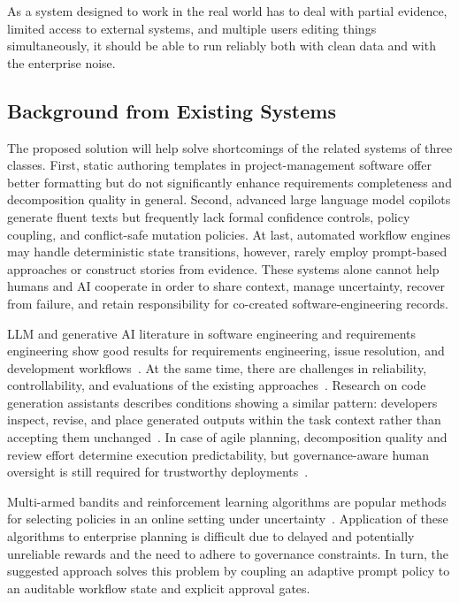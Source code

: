 \documentclass[pdflatex,sn-basic]{sn-jnl}
\begin{document}
As a system designed to work in the real world has to deal with partial evidence, limited access to external systems, and multiple users editing things simultaneously, it should be able to run reliably both with clean data and with the enterprise noise.

\subsection{Background from Existing Systems}
The proposed solution will help solve shortcomings of the related systems of three classes. First, static authoring templates in project-management software offer better formatting but do not significantly enhance requirements completeness and decomposition quality in general. Second, advanced large language model copilots generate fluent texts but frequently lack formal confidence controls, policy coupling, and conflict-safe mutation policies. At last, automated workflow engines may handle deterministic state transitions, however, rarely employ prompt-based approaches or construct stories from evidence. These systems alone cannot help humans and AI cooperate in order to share context, manage uncertainty, recover from failure, and retain responsibility for co-created software-engineering records.

LLM and generative AI literature in software engineering and requirements engineering show good results for requirements engineering, issue resolution, and development workflows~\citep{R60,R59}. At the same time, there are challenges in reliability, controllability, and evaluations of the existing approaches~\citep{R60,R59}. Research on code generation assistants describes conditions showing a similar pattern: developers inspect, revise, and place generated outputs within the task context rather than accepting them unchanged~\citep{R77,R78}. In case of agile planning, decomposition quality and review effort determine execution predictability, but governance-aware human oversight is still required for trustworthy deployments~\citep{R56,R52,R58}.

Multi-armed bandits and reinforcement learning algorithms are popular methods for selecting policies in an online setting under uncertainty~\citep{R84,R86,R100}. Application of these algorithms to enterprise planning is difficult due to delayed and potentially unreliable rewards and the need to adhere to governance constraints. In turn, the suggested approach solves this problem by coupling an adaptive prompt policy to an auditable workflow state and explicit approval gates.
\end{document}
